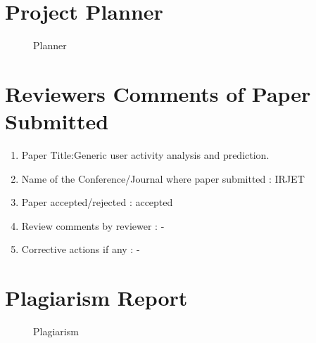 \documentclass[oneside,a4paper,12pt]{book}
\begin{document}
\begin{enumerate}
\begin{itemize}
\begin{appendices}
\begin{itemize}
\end{itemize}


\chapter{Project Planner}
\begin{center}
	\begin{figure}[!htbp]
		\centering
	  \caption{Planner}
	  \label{fig:planner}
	\end{figure}
\end{center}




\chapter{Reviewers Comments of Paper Submitted}

\begin{enumerate}
\item Paper Title:Generic user activity analysis and prediction.
\item Name of the Conference/Journal where paper submitted : IRJET
\item Paper accepted/rejected : accepted
\item Review comments by reviewer : -
\item Corrective actions if any :  -

\end{enumerate}

\chapter{Plagiarism Report}
\begin{center}
	\begin{figure}[!htbp]
		\centering
	  \caption{Plagiarism}
	  \label{fig:plagirism}
	\end{figure}
\end{center}
\newpage

\end{appendices}
\end{itemize}
\end{enumerate}
\end{document}
